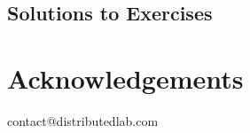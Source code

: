 \documentclass{zkdl-template}
\begin{document}
    \subsection*{Solutions to Exercises}
    

    \section{Acknowledgements}
    


     
    


    \newpage
    \pagestyle{empty}

    \ifodd\value{page}
        \newpage
    \fi

    \vspace*{\fill}

    \begin{center}
        contact@distributedlab.com
    \end{center}

    \vspace*{\fill}
\end{document}
